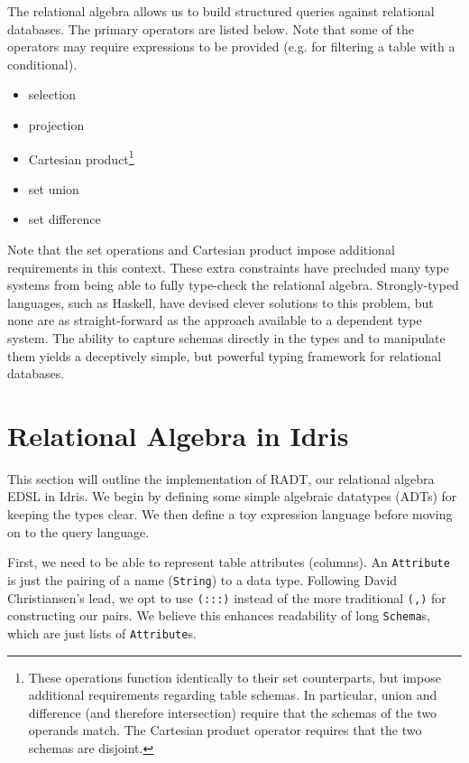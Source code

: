 \documentclass[12pt]{report}
\begin{document}
The relational algebra allows us to build structured queries against relational databases.
The primary operators are listed below.
Note that some of the operators may require expressions to be provided (e.g. for filtering a table with a conditional).

\begin{itemize}
    \item selection
    \item projection
    \item Cartesian product\footnote{\label{fn:set_ops} These operations function identically to their set counterparts, but impose additional requirements regarding table schemas. In particular, union and difference (and therefore intersection) require that the schemas of the two operands match. The Cartesian product operator requires that the two schemas are disjoint.}
    \item set union\footnotemark[\ref{fn:set_ops}]
    \item set difference\footnotemark[\ref{fn:set_ops}]
\end{itemize}

Note that the set operations and Cartesian product impose additional requirements in this context.
These extra constraints have precluded many type systems from being able to fully type-check the relational algebra.
Strongly-typed languages, such as Haskell, have devised clever solutions to this problem, but none are as straight-forward as the approach available to a dependent type system.
The ability to capture schemas directly in the types and to manipulate them yields a deceptively simple, but powerful typing framework for relational databases.

\section{Relational Algebra in Idris}

This section will outline the implementation of RADT, our relational algebra EDSL in Idris.
We begin by defining some simple algebraic datatypes (ADTs) for keeping the types clear.
We then define a toy expression language before moving on to the query language.

First, we need to be able to represent table attributes (columns).
An \texttt{Attribute} is just the pairing of a name (\texttt{String}) to a data type.
Following David Christiansen's lead, we opt to use \texttt{(:::)} instead of the more traditional \texttt{(,)} for constructing our pairs\cite{ChristiansenTypeProviders}.
We believe this enhances readability of long \texttt{Schema}s, which are just lists of \texttt{Attribute}s.
\end{document}
